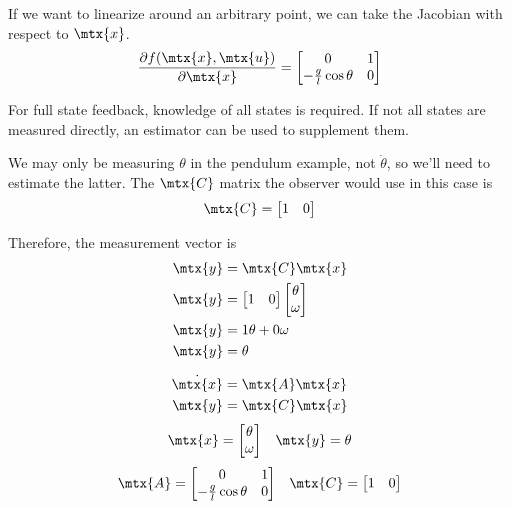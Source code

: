 If we want to linearize around an arbitrary point, we can take the Jacobian with
respect to $\mtx{x}$.
\begin{equation*}
  \frac{\partial f(\mtx{x}, \mtx{u})}{\partial\mtx{x}} =
  \begin{bmatrix}
    0 & 1 \\
    -\frac{g}{l}\cos\theta & 0
  \end{bmatrix}
\end{equation*}

For full \gls{state} feedback, knowledge of all \glspl{state} is required. If
not all \glspl{state} are measured directly, an estimator can be used to
supplement them.

We may only be measuring $\theta$ in the pendulum example, not $\dot{\theta}$,
so we'll need to estimate the latter. The $\mtx{C}$ matrix the \gls{observer}
would use in this case is
\begin{equation*}
  \mtx{C} = \begin{bmatrix}
    1 & 0 \\
  \end{bmatrix}
\end{equation*}

Therefore, the measurement vector is
\begin{align*}
  \mtx{y} &= \mtx{C}\mtx{x} \\
  \mtx{y} &= \begin{bmatrix}
    1 & 0
  \end{bmatrix}
  \begin{bmatrix}
    \theta \\
    \omega
  \end{bmatrix} \\
  \mtx{y} &= 1\theta + 0\omega \\
  \mtx{y} &= \theta
\end{align*}
\begin{theorem}
  \begin{align*}
    \dot{\mtx{x}} &= \mtx{A} \mtx{x} \\
    \mtx{y} &= \mtx{C} \mtx{x}
  \end{align*}
  \begin{equation*}
    \begin{array}{ccc}
      \mtx{x} =
      \begin{bmatrix}
        \theta \\
        \omega
      \end{bmatrix} &
      \mtx{y} = \theta
    \end{array}
  \end{equation*}
  \begin{equation}
    \begin{array}{cccc}
      \mtx{A} =
      \begin{bmatrix}
        0 & 1 \\
        -\frac{g}{l}\cos\theta & 0
      \end{bmatrix} &
      \mtx{C} =
      \begin{bmatrix}
        1 & 0
      \end{bmatrix}
    \end{array}
  \end{equation}
\end{theorem}

